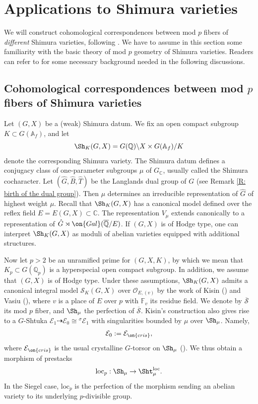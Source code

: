 \documentclass[11pt]{amsart}
\theoremstyle{definition}
\theoremstyle{definition}
\theoremstyle{definition}
\numberwithin{equation}{subsection}
\def\FF{\mathbb{F}}
\newcommand{\bA}{{\mathbb A}}
\newcommand{\bC}{{\mathbb C}}
\newcommand{\bQ}{{\mathbb Q}}
\newcommand{\mE}{{\mathcal E}}
\newcommand{\mO}{{\mathcal O}}
\newcommand{\Gal}{{\on{Gal}}}
\newcommand{\loc}{\mathrm{loc}}
\begin{document}
\section{Applications to Shimura varieties}
\label{S:app to Sh}
We will construct cohomological correspondences between mod $p$ fibers of \emph{different} Shimura varieties, following \cite[\S 7]{XZ}. We have to assume in this section some familiarity with the basic theory of mod $p$ geometry of Shimura varieties. Readers can refer to \cite[\S 7.1, \S 7.2]{XZ} for some necessary background needed in the following discussions.

\subsection{Cohomological correspondences between mod $p$ fibers of Shimura varieties}


Let $(G,X)$ be a (weak) Shimura datum. We fix an open compact subgroup $K\subset G(\bA_f)$, and let
\[\Sh_K(G,X)=G(\bQ)\backslash X\times G(\bA_f)/K\]
denote the corresponding Shimura variety.  The Shimura datum defines a conjugacy class of one-parameter subgroups $\mu$ of $G_\bC$, usually called the Shimura cocharacter.
Let $(\hat G,\hat B,\hat T)$ be the Langlands dual group of $G$ (see Remark \ref{R: birth of the dual group}). Then $\mu$ determines an irreducible representation of $\hat G$ of highest weight $\mu$.
Recall that $\Sh_K(G,X)$ has a canonical model defined over the reflex field $E=E(G,X)\subset \bC$. The representation $V_\mu$ extends canonically to a representation of $\hat G\rtimes \Gal(\overline\bQ/E)$.
If  $(G,X)$ is of Hodge type, one can interpret $\Sh_K(G,X)$ as moduli of abelian varieties equipped with additional structures.


Now let $p>2$ be an unramified prime for $(G,X,K)$, by which we mean that $K_p\subset G(\bQ_p)$ is a hyperspecial open compact subgroup. 
In addition, we assume that $(G,X)$ is of Hodge type. Under these assumptions, $\Sh_K(G,X)$ admits a canonical integral model $\mathscr S_K(G,X)$ over $\mO_{E,(v)}$ by the work of Kisin (\cite{Ki}) and Vasiu (\cite{Vasiu}), where $v$ is a place of $E$ over $p$ with $\FF_v$ its residue field. We denote by $\overline{\mathscr S}$ its mod $p$ fiber, and $\Sh_\mu$ the perfection of $\overline{\mathscr S}$. Kisin's construction also gives rise to a $G$-Shtuka $\mE_1\dashrightarrow \mE_0\cong {^\sigma}\mE_1$ with singularities bounded by $\mu$ over $\Sh_\mu$. Namely,
\[\mE_0:=\mE_{\on{cris}},\]
where $\mE_{\on{cris}}$ is the usual crystalline $G$-torsor on $\Sh_\mu$ (\cite[Corollary 7.1.14]{XZ}).
We thus obtain a morphism of prestacks
\[\loc_p: \Sh_{\mu}\to \Sht_{\mu}^\loc.\]
In the Siegel case, $\loc_p$ is the perfection of the morphism sending an abelian variety to its underlying $p$-divisible group. 
\end{document}
